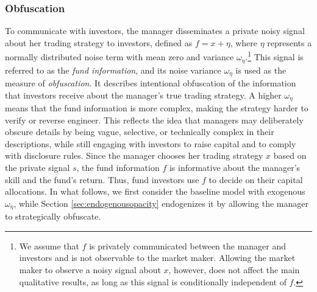 \subsubsection{Obfuscation}
To communicate with investors, the manager disseminates a private noisy signal about her trading strategy to investors, defined as $f = x + \eta$, where $\eta$ represents a normally distributed noise term with mean zero and variance $\omega_{\eta}$.\footnote{We assume that $f$ is privately communicated between the manager and investors and is not observable to the market maker. Allowing the market maker to observe a noisy signal about $x$, however, does not affect the main qualitative results, as long as this signal is conditionally independent of $f$.} This signal is referred to as the \textit{fund information}, and its noise variance $\omega_{\eta}$ is used as the measure of \textit{obfuscation}. It describes intentional obfuscation of the information that investors receive about the manager’s true trading strategy. A higher $\omega_{\eta}$ means that the fund information is more complex, making the strategy harder to verify or reverse engineer. This reflects the idea that managers may deliberately obscure details by being vague, selective, or technically complex in their descriptions, while still engaging with investors to raise capital and to comply with disclosure rules.
Since the manager chooses her trading strategy $x$ based on the private signal $s$, the fund information $f$ is informative about the manager’s skill and the fund’s return. Thus, fund investors use $f$ to decide on their capital allocations. In what follows, we first consider the baseline model with exogenous $\omega_{\eta}$, while Section \ref{sec:endogenousopacity} endogenizes it by allowing the manager to strategically obfuscate.

